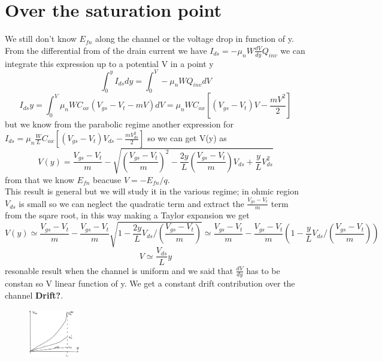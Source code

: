 \section{Over the saturation point}
We still don't know $E_{fn}$ along the channel or the voltage drop in function of y.\\
From the differential from of the drain current we have $I_{ds}=-\mu_nW \frac{dV}{dy}Q_{inv}$ we can integrate this expression up to a potential V in a point y
\begin{equation}
\int_0^yI_{ds}dy=\int^V_0-\mu_nWQ_{inv}dV
\end{equation}
\begin{equation}
I_{ds}y=\int^V_0\mu_nWC_{ox}(V_{gs}-V_t-mV)dV=\mu_nWC_{ox}[(V_{gs}-V_{t})V-\frac{mV^2}{2}]
\end{equation}
but we know from the parabolic regime another expression for $I_{ds}=\mu_n \frac{W}{L}C_{ox}[(V_{gs}-V_{t})V_{ds}-\frac{mV_{ds}^2}{2}]$ so we can get V(y) as
\begin{equation}
V(y)=\frac{V_{gs}-V_{t}}{m}-\sqrt{\left(\frac{V_{gs}-V_{t}}{m}\right)^2-\frac{2y}{L}\left(\frac{V_{gs}-V_{t}}{m}\right)V_{ds}+\frac{y}{L}V_{ds}^2}
\end{equation}
from that we know $E_{fn}$ beacuse $V=-E_{fn}/q$.\\
This result is general but we will study it in the various regime; in ohmic region $V_{ds}$ is small so we can neglect the quadratic term and extract the $\frac{V_{gs}-V_{t}}{m}$ term from the sqare root, in this way making a Taylor expansion we get
\begin{equation}
V(y)\simeq\frac{V_{gs}-V_{t}}{m}-\frac{V_{gs}-V_{t}}{m}\sqrt{1-\frac{2y}{L}V_{ds}/\left(\frac{V_{gs}-V_{t}}{m}\right)}\simeq \frac{V_{gs}-V_{t}}{m}-\frac{V_{gs}-V_{t}}{m}\left(1-\frac{y}{L}V_{ds}/\left(\frac{V_{gs}-V_{t}}{m}\right)\right)
\end{equation}
\begin{equation}
V\simeq \frac{V_{ds}}{L}y
\end{equation}
resonable result when the channel is uniform and we said that $\frac{dV}{dy}$ has to be constan so V linear function of y. We get a constant drift contribution over the channel {\bf Drift?}.\\

\begin{figure}
\includegraphics[width=0.2\textwidth]{g1.png}
\end{figure}


